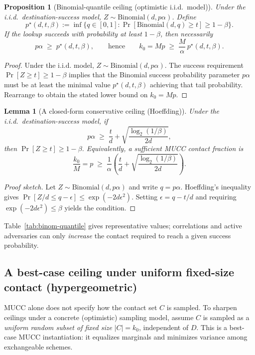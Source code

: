 \documentclass[11pt]{article}
\newtheorem{lemma}{Lemma}
\newtheorem{proposition}{Proposition}
\begin{document}
\begin{proposition}[Binomial-quantile ceiling (optimistic i.i.d.\ model)]
\label{prop:binom-quantile-ceiling}
Under the i.i.d.\ destination-success model, $Z\sim \mathrm{Binomial}(d,p\alpha)$.
Define
\[
p^\star(d,t,\beta) := \inf\{q\in[0,1] : \Pr[\mathrm{Binomial}(d,q)\ge t]\ge 1-\beta\}.
\]
If the lookup succeeds with probability at least $1-\beta$, then necessarily
\[
p\alpha \;\ge\; p^\star(d,t,\beta),
\qquad\text{hence}\qquad
k_0 = Mp \;\ge\; \frac{M}{\alpha}\,p^\star(d,t,\beta).
\]
\end{proposition}

\begin{proof}
Under the i.i.d. model, $Z\sim\mathrm{Binomial}(d,p\alpha)$.
The success requirement $\Pr[Z\ge t]\ge 1-\beta$ implies that the Binomial success probability parameter $p\alpha$ must be at least the minimal value $p^\star(d,t,\beta)$ achieving that tail probability.
Rearrange to obtain the stated lower bound on $k_0=Mp$.
\end{proof}

\begin{lemma}[A closed-form conservative ceiling (Hoeffding)]
\label{lem:hoeffding-ceiling}
Under the i.i.d.\ destination-success model, if
\[
p\alpha \;\ge\; \frac{t}{d} + \sqrt{\frac{\log_2(1/\beta)}{2d}},
\]
then $\Pr[Z\ge t]\ge 1-\beta$.
Equivalently, a sufficient MUCC contact fraction is
\[
\frac{k_0}{M}=p \;\ge\; \frac{1}{\alpha}\left(\frac{t}{d} + \sqrt{\frac{\log_2(1/\beta)}{2d}}\right).
\]
\end{lemma}

\begin{proof}[Proof sketch]
Let $Z\sim\mathrm{Binomial}(d,p\alpha)$ and write $q=p\alpha$.
Hoeffding's inequality gives $\Pr[Z/d \le q-\epsilon]\le \exp(-2d\epsilon^2)$.
Setting $\epsilon = q - t/d$ and requiring $\exp(-2d\epsilon^2)\le\beta$ yields the condition.
\end{proof}

Table~\ref{tab:binom-quantile} gives representative values; correlations and active adversaries can only \emph{increase} the contact required to reach a given success probability.

\subsection{A best-case ceiling under uniform fixed-size contact (hypergeometric)}
MUCC alone does not specify how the contact set $C$ is sampled.
To sharpen ceilings under a concrete (optimistic) sampling model, assume $C$ is sampled as a \emph{uniform random subset of fixed size} $|C|=k_0$, independent of $D$.
This is a best-case MUCC instantiation: it equalizes marginals and minimizes variance among exchangeable schemes.
\end{document}

